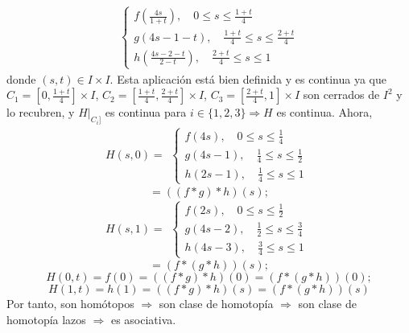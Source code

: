 \begin{dem}
\begin{itemize}
\[\begin{aligned}
\begin{cases}
            f(\frac{4s}{1 + t}), \quad 0 \leq s \leq \frac{1 + t}{4} \\
            g(4s -1 -t), \quad \frac{1 + t}{4} \leq s \leq \frac{2 + t}{4} \\
            h(\frac{4s - 2 - t}{2 - t}), \quad \frac{2 + t}{4} \leq s \leq 1
          \end{cases}
        \end{aligned}
      \] 
    donde $(s, t) \in I \times I$. Esta aplicación está bien definida y es continua ya que $C_{1} = [0, \frac{1 + t}{4}] \times I$, $C_{2} = [\frac{1 + t}{4}, \frac{2 + t}{4}] \times I$, $C_{3} = [\frac{2 + t}{4}, 1] \times I$ son cerrados de $I^{2}$ y lo recubren, y $H|_{C_{i}]}$ es continua para $i \in \{ 1, 2, 3 \} \Rightarrow H$ es continua. Ahora,
    \[ 
      H(s,0) =
      \begin{aligned}
        \begin{cases}
          f(4s), \quad 0 \leq s \leq \frac{1}{4} \\
          g(4s - 1), \quad \frac{1}{4} \leq s \leq \frac{1}{2} \\
          h(2s - 1), \quad \frac{1}{4} \leq s \leq 1
        \end{cases}
      \end{aligned}  
    \] 
    \[ 
      = ((f * g) * h)(s);
    \] 
    \[ 
      H(s,1) =
      \begin{aligned}
        \begin{cases}
          f(2s), \quad 0 \leq s \leq \frac{1}{2} \\
          g(4s - 2), \quad \frac{1}{2} \leq s \leq \frac{3}{4} \\
          h(4s - 3), \quad \frac{3}{4} \leq s \leq 1
        \end{cases}
      \end{aligned} 
    \] 
    \[ 
      = (f * (g * h))(s) ;
    \] 
    \[ 
      H(0, t) = f(0) = ((f * g) * h)(0) = (f * (g * h))(0) ;
    \] 
    \[ 
      H(1, t) = h(1) = ((f * g) * h)(s) = (f * (g * h))(s)
    \] 
    Por tanto, son homótopos $\Rightarrow$ son clase de homotopía $\Rightarrow$ son clase de homotopía lazos $\Rightarrow$ es asociativa.
    

\end{itemize}
\end{dem}
